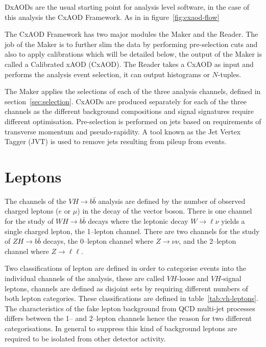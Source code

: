 DxAODs are the usual starting point for analysis level software, in the case of
this analysis the CxAOD Framework. As in in figure~\ref{fig:cxaod-flow}

The CxAOD Framework has two major modules the Maker and the Reader. The job of
the Maker is to further slim the data by performing pre-selection cuts and also
to apply calibrations which will be detailed below, the output of the Maker is
called a Calibrated xAOD (CxAOD). The Reader takes a CxAOD as input and performs
the analysis event selection, it can output histograms or $N$-tuples.

The Maker applies the selections of each of the three analysis channels, defined
in section~\ref{sec:selection}. CxAODs are produced separately for each of the
three channels as the different background compositions and signal signatures
require different optimisation. Pre-selection is performed on jets based on
requirements of transverse momentum and pseudo-rapidity. A tool known as the Jet
Vertex Tagger (JVT) is used to remove jets resulting from pileup from events.

\section{Leptons}%
\label{sec:lepton}

The channels of the $VH \to b\bar{b}$ analysis are defined by the number of
observed charged leptons ($e$ or $\mu$) in the decay of the vector boson. There
is one channel for the study of $WH \to b\bar{b}$ decays where the leptonic
decay $W \rightarrow \ell\nu$ yields a single charged lepton, the 1--lepton
channel. There are two channels for the study of $ZH \to b\bar{b}$ decays, the
0--lepton channel where $Z \rightarrow \nu\nu$, and the 2--lepton channel where
$Z \rightarrow \ell\ell$.

Two classifications of lepton are defined in order to categorise events into the
individual channels of the analysis, these are called $VH$-loose and $VH$-signal
leptons, channels are defined as disjoint sets by requiring different numbers of
both lepton categories. These classifications are defined in
table~\ref{tab:vh-leptons}. The characteristics of the fake lepton background
from QCD multi-jet processes differs between the 1-- and 2--lepton channels
hence the reason for two different categorisations. In general to suppress this
kind of background leptons are required to be isolated from other detector
activity.


